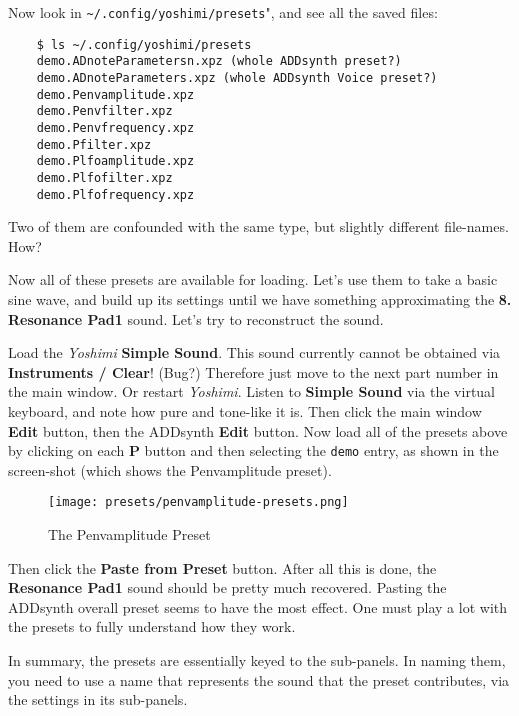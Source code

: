    Now look in \texttt{\textasciitilde/.config/yoshimi/presets}",
   and see all the saved files:

\begin{verbatim}
	$ ls ~/.config/yoshimi/presets
	demo.ADnoteParametersn.xpz (whole ADDsynth preset?)
	demo.ADnoteParameters.xpz (whole ADDsynth Voice preset?)
	demo.Penvamplitude.xpz
	demo.Penvfilter.xpz
	demo.Penvfrequency.xpz
	demo.Pfilter.xpz
	demo.Plfoamplitude.xpz
	demo.Plfofilter.xpz
	demo.Plfofrequency.xpz
\end{verbatim}

	Two of them are confounded with the same type, but slightly
   different file-names.  How?

   Now all of these presets are available for loading.
   Let's use them to take a basic sine wave, and build up its settings until
   we have something approximating the \textbf{8. Resonance Pad1} sound.
   Let's try to reconstruct the sound.
   
   Load the \textsl{Yoshimi} \textbf{Simple Sound}. 
   This sound currently cannot be obtained via \textbf{Instruments / Clear}!
   (Bug?)
   Therefore just move to the next part number in the main window.
   Or restart \textsl{Yoshimi}.
   Listen to \textbf{Simple Sound} via the virtual keyboard, and note
   how pure and tone-like it is.
   Then click the main window \textbf{Edit} button, then the
   ADDsynth \textbf{Edit} button.
   Now load all of the presets above by clicking on each \textbf{P}
   button and then selecting the \texttt{demo} entry, 
   as shown in the screen-shot (which shows the Penvamplitude preset).

\begin{figure}[H]
   \centering 
   \texttt{[image: presets/penvamplitude-presets.png]}
   \caption{The Penvamplitude Preset}
   \label{fig:presets_penvamplitude}
\end{figure}

   Then click the \textbf{Paste from Preset} button.
   After all this is done, the
   \textbf{Resonance Pad1} sound should 
   be pretty much recovered.
   Pasting the ADDsynth overall preset seems to have the most effect.
   One must play a lot with the presets to fully understand how they work.

   In summary, the presets are essentially keyed to the sub-panels.
   In naming them, you need to use a name that represents the sound that the
   preset contributes, via the settings in its sub-panels.

